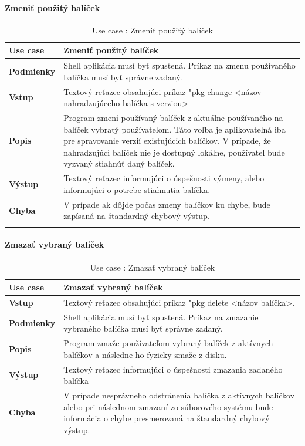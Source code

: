 \paragraph{Zmeniť  použitý balíček}
\begin{center}
	\begin{longtable}{|p{2.5cm}|p{12.2cm}|}
		
			\hline
			\textbf{Use case} & Zmeniť  použitý balíček \\ 
			\hline
			\textbf{Podmienky} & Shell aplikácia musí byť spustená. Príkaz na zmenu používaného balíčka musí byť správne zadaný.\\ 
			\hline
			\textbf{Vstup} & Textový reťazec obsahujúci príkaz "pkg change  <názov nahradzujúceho balíčka s verziou>\\
			\hline
			\textbf{Popis} & Program zmení používaný balíček z aktuálne používaného na balíček vybratý používateľom. Táto voľba je aplikovateľná iba pre spravovanie verzií existujúcich balíčkov. V prípade, že nahradzujúci balíček nie je dostupný lokálne, používateľ bude vyzvaný stiahnúť daný balíček.\\ 
			\hline
			\textbf{Výstup} & Textový reťazec informujúci o úspešnosti výmeny, alebo informujúci o potrebe stiahnutia balíčka.\\
			\hline
			\textbf{Chyba} & V prípade ak dôjde počas zmeny balíčkov ku chybe, bude zapísaná na štandardný chybový výstup.\\
			\hline
		\caption{Use case : Zmeniť  použiťý balíček}
		\label{table:1}
		
	\end{longtable}
\end{center}

\paragraph{Zmazať vybraný balíček}
\begin{center}
	\begin{longtable}{|p{2.5cm}|p{12.2cm}|}
		
			\hline
			\textbf{Use case} & Zmazať vybraný balíček \\ 
			\hline
			\textbf{Vstup} & Textový reťazec obsahujúci príkaz "pkg delete <názov balíčka>.\\
			\hline
			\textbf{Podmienky} & Shell aplikácia musí byť spustená. Príkaz na zmazanie vybraného balíčka musí byť správne zadaný.\\ 
			\hline
			\textbf{Popis} & Program zmaže používateľom vybraný balíček z aktívnych balíčkov a následne ho fyzicky zmaže z disku. \\
			\hline

			\textbf{Výstup} & Textový reťazec informujúci o úspešnosti zmazania zadaného balíčka\\
			\hline
			\textbf{Chyba} & V prípade nesprávneho odstránenia balíčka z aktívnych balíčkov alebo pri následnom zmazaní zo súborového systému bude informácia o chybe presmerovaná na štandardný chybový výstup.\\
			\hline
		\caption{Use case : Zmazať vybraný balíček}
		\label{table:1}
		
	\end{longtable}
\end{center}
